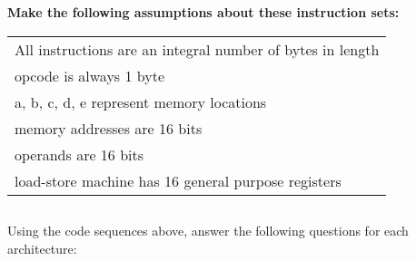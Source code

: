 \documentclass{article}
\begin{document}
\textbf{Make the following assumptions about these instruction sets: }
\vspace{5mm}

\begin{tabular}{|l|}
\hline
All instructions are an integral number of bytes in length \\
opcode is always 1 byte \\
a, b, c, d, e represent memory locations \\ 
memory addresses are 16 bits \\
operands are 16 bits \\
load-store machine has 16 general purpose registers \\
\hline
\end{tabular}
\vspace{5mm}

\subsection{}
Using the code sequences above, answer the following questions for each architecture:
\end{document}
